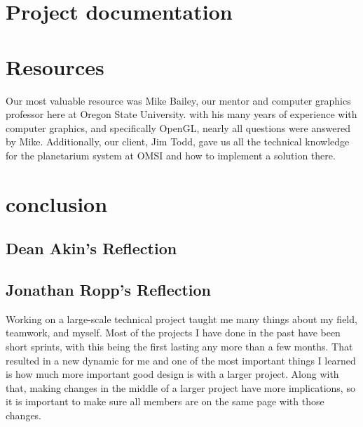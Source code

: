 \documentclass[onecolumn, draftclsnofoot,10pt, compsoc]{IEEEtran}
\begin{document}
\section{Project documentation}



\section{Resources}

Our most valuable resource was Mike Bailey, our mentor and computer graphics professor here at Oregon State University. with his many years of experience with computer graphics, and specifically OpenGL, nearly all questions were answered by Mike. Additionally, our client, Jim Todd, gave us all the technical knowledge for the planetarium system at OMSI and how to implement a solution there. 

 
 
\section{conclusion}


\subsection{Dean Akin's Reflection}


\subsection{Jonathan Ropp's Reflection}
Working on a large-scale technical project taught me many things about my field, teamwork, and myself. Most of the projects I have done in the past have been short sprints, with this being the first lasting any more than a few months. That resulted in a new dynamic for me and one of the most important things I learned is how much more important good design is with a larger project. Along with that, making changes in the middle of a larger project have more implications, so it is important to make sure all members are on the same page with those changes. 
\end{document}

